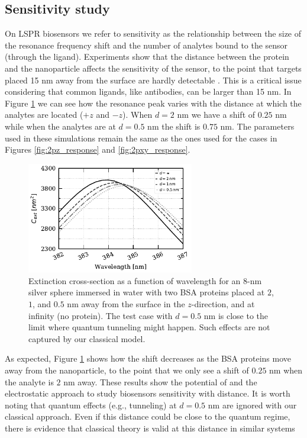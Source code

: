 \subsection{Sensitivity study} \label{sec:sensitivity}

On LSPR biosensors we refer to sensitivity as the relationship between the size of the 
resonance frequency shift and the number of analytes bound to the sensor (through the 
ligand). Experiments show that the distance between the protein and the nanoparticle 
affects the sensitivity of the sensor, to the point that targets placed 15 nm away 
from the surface are hardly detectable \cite{HaesETal2004}. This is a critical issue
considering that common ligands, like antibodies, can be larger than 15 nm. In 
Figure \ref{fig:dist_response} we can see how the resonance peak varies with the distance 
at which the  analytes are located ($+z$ and $-z$). When $d=2$ nm we have a shift of 
$0.25$ nm while when the analytes are at $d=0.5$ nm the shift is $0.75$ nm. The parameters
used in these simulations remain the same as the ones used for the cases in Figures 
\ref{fig:2pz_response} and \ref{fig:2pxy_response}.

\begin{figure}[h] %
    \centering
    \includegraphics[width=0.65\textwidth]{2pz_lspr_response.pdf} 
    \caption{Extinction cross-section as a function of wavelength for an $8$-nm
             silver sphere immersed in water with two BSA proteins placed at
             $2$, $1$, and $0.5$ nm away from the surface in the 
             $z$-direction, and at infinity (no protein). The test case with
             $d=0.5$ nm is close to the limit where quantum tunneling might happen. 
             Such effects are not captured by our classical model.}
    \label{fig:dist_response}
 \end{figure}

As expected, Figure \ref{fig:dist_response} shows how the shift decreases as the BSA 
proteins move away from the nanoparticle, to the point that we only see a shift of 
$0.25$ nm when the analyte is $2$ nm away. These results show the potential of \pygbe 
and the electrostatic approach to study biosensors sensitivity with distance. It is 
worth noting that quantum effects (e.g., tunneling) at $d=0.5$ nm are ignored with 
our classical approach. Even if this distance could be close to the quantum regime, 
there is evidence that classical theory is valid at this distance in similar systems
\cite{SavageETal2012, EstebanETal2012}

